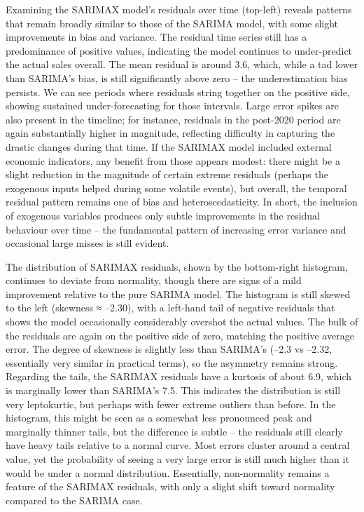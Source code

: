 \documentclass[12pt,a4paper]{report}
\begin{document}
Examining the SARIMAX model's residuals over time (top-left) reveals patterns that remain broadly similar to those of the SARIMA model, with some slight improvements in bias and variance. The residual time series still has a predominance of positive values, indicating the model continues to under-predict the actual sales overall. The mean residual is around 3.6, which, while a tad lower than SARIMA's bias, is still significantly above zero – the underestimation bias persists. We can see periods where residuals string together on the positive side, showing sustained under-forecasting for those intervals. Large error spikes are also present in the timeline; for instance, residuals in the post-2020 period are again substantially higher in magnitude, reflecting difficulty in capturing the drastic changes during that time. If the SARIMAX model included external economic indicators, any benefit from those appears modest: there might be a slight reduction in the magnitude of certain extreme residuals (perhaps the exogenous inputs helped during some volatile events), but overall, the temporal residual pattern remains one of bias and heteroscedasticity. In short, the inclusion of exogenous variables produces only subtle improvements in the residual behaviour over time – the fundamental pattern of increasing error variance and occasional large misses is still evident. 

The distribution of SARIMAX residuals, shown by the bottom-right histogram, continues to deviate from normality, though there are signs of a mild improvement relative to the pure SARIMA model. The histogram is still skewed to the left (skewness ≈ –2.30), with a left-hand tail of negative residuals that shows the model occasionally considerably overshot the actual values. The bulk of the residuals are again on the positive side of zero, matching the positive average error. The degree of skewness is slightly less than SARIMA's (–2.3 vs –2.32, essentially very similar in practical terms), so the asymmetry remains strong. Regarding the tails, the SARIMAX residuals have a kurtosis of about 6.9, which is marginally lower than SARIMA's 7.5. This indicates the distribution is still very leptokurtic, but perhaps with fewer extreme outliers than before. In the histogram, this might be seen as a somewhat less pronounced peak and marginally thinner tails, but the difference is subtle – the residuals still clearly have heavy tails relative to a normal curve. Most errors cluster around a central value, yet the probability of seeing a very large error is still much higher than it would be under a normal distribution. Essentially, non-normality remains a feature of the SARIMAX residuals, with only a slight shift toward normality compared to the SARIMA case. 
\end{document}

